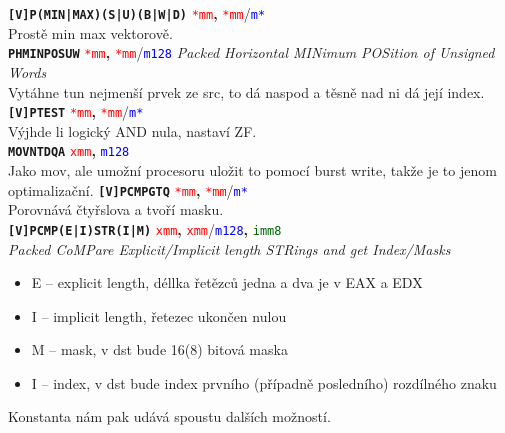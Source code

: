 \documentclass[
]{cz_sablona}
\newcommand{\reg}[1]{\texttt{\textcolor{red}{#1}}}
\newcommand{\mem}[1]{\texttt{\textcolor{blue}{#1}}}
\newcommand{\const}[1]{\texttt{\textcolor{darkgreen}{#1}}}
\newcommand{\instr}[1]{\texttt{\textbf{#1}}}
\begin{document}
\instr{[V]P(MIN|MAX)(S|U)(B|W|D)} \reg{*mm}\textbf{,} \reg{*mm}/\mem{m*}\\
Prostě min max vektorově.\\
\instr{PHMINPOSUW} \reg{*mm}\textbf{,} \reg{*mm}/\mem{m128}
\textit{Packed Horizontal MINimum POSition of Unsigned Words}\\
Vytáhne tun nejmenší prvek ze src, to dá naspod a těsně nad ni dá její index.
\\[0.5em]
\instr{[V]PTEST} \reg{*mm}\textbf{,} \reg{*mm}/\mem{m*}\\
Výjhde li logický AND nula, nastaví ZF.
\\[0.5em]
\instr{MOVNTDQA} \reg{xmm}\textbf{,} \mem{m128}\\
Jako mov, ale umožní procesoru uložit to pomocí burst write,
takže je to jenom optimalizační.
\instr{[V]PCMPGTQ} \reg{*mm}\textbf{,} \reg{*mm}/\mem{m*}\\
Porovnává čtyřslova a tvoří masku.
\\[0.5em]
\instr{[V]PCMP(E|I)STR(I|M)} \reg{xmm}\textbf{,} \reg{xmm}/\mem{m128}\textbf{,} \const{imm8}\\
\textit{Packed CoMPare Explicit/Implicit length STRings and get Index/Masks}\\
\begin{itemize}
    \item E -- explicit length, déllka řetězců jedna a dva je v EAX a EDX
    \item I -- implicit length, řetezec ukončen nulou
    \item M -- mask, v dst bude 16(8) bitová maska
    \item I -- index, v dst bude index prvního (případně posledního) rozdílného znaku
\end{itemize}
Konstanta nám pak udává spoustu dalších možností.\\
\end{document}
